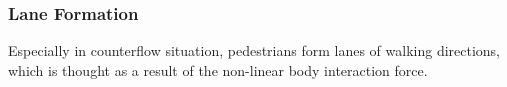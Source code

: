 




\subsubsection{Lane Formation}
Especially in counterflow situation, pedestrians form lanes of walking 
directions, which is thought as a result of the non-linear body interaction 
force.

